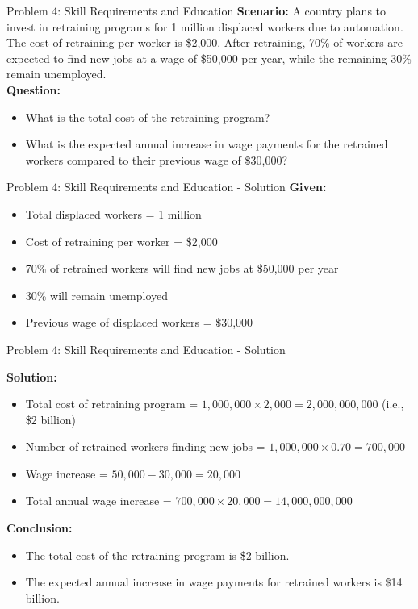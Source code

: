 \documentclass{beamer}
\begin{document}
\begin{frame}{Problem 4: Skill Requirements and Education}
\textbf{Scenario:}
A country plans to invest in retraining programs for 1 million displaced workers due to automation. The cost of retraining per worker is \$2,000. After retraining, 70\% of workers are expected to find new jobs at a wage of \$50,000 per year, while the remaining 30\% remain unemployed.
\vspace{.5cm}\\
\textbf{Question:}
\begin{itemize}
    \item What is the total cost of the retraining program?
    \item What is the expected annual increase in wage payments for the retrained workers compared to their previous wage of \$30,000?
\end{itemize}
\end{frame}

\begin{frame}{Problem 4: Skill Requirements and Education - Solution}
\textbf{Given:}
\begin{itemize}
    \item Total displaced workers = 1 million
    \item Cost of retraining per worker = \$2,000
    \item 70\% of retrained workers will find new jobs at \$50,000 per year
    \item 30\% will remain unemployed
    \item Previous wage of displaced workers = \$30,000
\end{itemize}


\end{frame}


\begin{frame}{Problem 4: Skill Requirements and Education - Solution}


\textbf{Solution:}
\begin{itemize}
    \item Total cost of retraining program = \( 1,000,000 \times 2,000 = 2,000,000,000 \) (i.e., \$2 billion)
    \item Number of retrained workers finding new jobs = \( 1,000,000 \times 0.70 = 700,000 \)
    \item Wage increase = \( 50,000 - 30,000 = 20,000 \)
    \item Total annual wage increase = \( 700,000 \times 20,000 = 14,000,000,000 \)
\end{itemize}

\textbf{Conclusion:}
\begin{itemize}
    \item The total cost of the retraining program is \$2 billion.
    \item The expected annual increase in wage payments for retrained workers is \$14 billion.
\end{itemize}
\end{frame}
\end{document}
